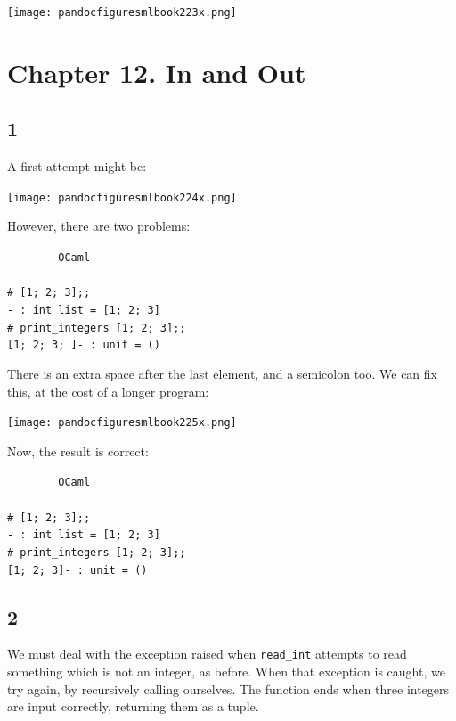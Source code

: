 \documentclass[]{book}
\newcommand{\smspace}{\vspace{4mm}}
\begin{document}
\medskip
\begin{center}
\noindent\texttt{[image: pandocfiguresmlbook223x.png]}
\end{center}
\medskip


\section*{Chapter 12. In and Out}
\subsection*{1}
A first attempt might be:


\medskip
\begin{center}
\noindent\texttt{[image: pandocfiguresmlbook224x.png]}
\end{center}
\medskip


\noindent However, there are two problems:

\smspace
\noindent\verb!        OCaml!\\
\noindent\\
\noindent\verb!# [1; 2; 3];;!\\
\noindent\verb!- : int list = [1; 2; 3]!\\
\noindent\verb!# print_integers [1; 2; 3];;!\\      
\noindent\verb![1; 2; 3; ]- : unit = ()!\vphantom{g}
\smspace

\noindent There is an extra space after the last element, and a semicolon too. We can fix this, at the cost of a longer program:

\medskip
\begin{center}
\noindent\texttt{[image: pandocfiguresmlbook225x.png]}
\end{center}
\medskip

\noindent Now, the result is correct:

\smspace
\noindent\verb!        OCaml!\\
\noindent\\
\noindent\verb!# [1; 2; 3];;!\\
\noindent\verb!- : int list = [1; 2; 3]!\\
\noindent\verb!# print_integers [1; 2; 3];;!\\ 
\noindent\verb![1; 2; 3]- : unit = ()!\vphantom{g}

\subsection*{2}
We must deal with the exception raised when \texttt{read\_int} attempts to read something which is not an integer, as before. When that exception is caught, we try again, by recursively calling ourselves. The function ends when three integers are input correctly, returning them as a tuple.
\end{document}
